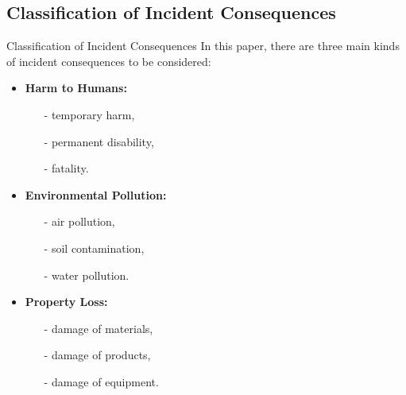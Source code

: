 \subsection{Classification of Incident Consequences}
\begin{frame}{Classification of Incident Consequences}
    In this paper, there are three main kinds of incident consequences to be considered:
    \begin{itemize}
      \item \textbf{Harm to Humans:}\\[-5pt]
      \begin{itemize}
        \item[-] temporary harm,
        \item[-] permanent disability,
        \item[-] fatality.
      \end{itemize}
      \item \textbf{Environmental Pollution:}\\[-5pt]
      \begin{itemize}
        \item[-] air pollution,
        \item[-] soil contamination,
        \item[-] water pollution.
      \end{itemize}
      \item \textbf{Property Loss:}\\[-5pt]
      \begin{itemize}
        \item[-] damage of materials,
        \item[-] damage of products,
        \item[-] damage of equipment.
      \end{itemize}
    \end{itemize}
\end{frame}

